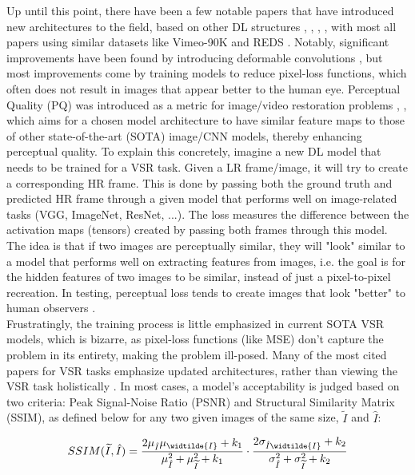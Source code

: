 \documentclass{article}
\begin{document}
Up until this point, there have been a few notable papers that have introduced new architectures to the field, based on other DL structures \cite{chan_basicvsr_2021}, \cite{chan_basicvsr_2022}, \cite{liang_recurrent_nodate}, \cite{rota_enhancing_2023}, with most all papers using similar datasets like Vimeo-90K \cite{xue_video_2019} and REDS \cite{nah_ntire_2021}. Notably, significant improvements have been found by introducing deformable convolutions \cite{dai_deformable_2016}, but most improvements come by training models to reduce pixel-loss functions, which often does not result in images that appear better to the human eye. Perceptual Quality (PQ) was introduced as a metric for image/video restoration problems \cite{johnson_perceptual_2016}, \cite{zhang_unreasonable_2018}, which aims for a chosen model architecture to have similar feature maps to those of other state-of-the-art (SOTA) image/CNN models, thereby enhancing perceptual quality. To explain this concretely, imagine a new DL model that needs to be trained for a VSR task. Given a LR frame/image, it will try to create a corresponding HR frame.  This is done by passing both the ground truth and predicted HR frame through a given model that performs well on image-related tasks (VGG, ImageNet, ResNet, ...). The loss measures the difference between the activation maps (tensors) created by passing both frames through this model. The idea is that if two images are perceptually similar, they will "look" similar to a model that performs well on extracting features from images, i.e. the goal is for the hidden features of two images to be similar, instead of just a pixel-to-pixel recreation. In testing, perceptual loss tends to create images that look "better" to human observers \cite{zhang_unreasonable_2018}. \\ %

Frustratingly, the training process is little emphasized in current SOTA VSR models, which is bizarre, as pixel-loss functions (like MSE) don’t capture the problem in its entirety, making the problem ill-posed. Many of the most cited papers for VSR tasks emphasize updated architectures, rather than viewing the VSR task holistically \cite{liu_video_2022}. In most cases, a model's acceptability is judged based on two criteria: Peak Signal-Noise Ratio (PSNR) and Structural Similarity Matrix (SSIM), as defined below for any two given images of the same size, \(\widetilde{I}\) and \(\hat{I}\): 

\begin{equation}
    SSIM(\widetilde{I}, \hat{I}) = \frac{
        2 \mu_{\hat{I}} \mu_{\widtilde{I}} + k_1}{
        \mu^2_{\hat{I}} + \mu^2_{\widetilde{I}} + k_1}
        \cdot
        \frac{
        2 \sigma_{\hat{I} \widtilde{I}} + k_2
        }{ \sigma^2_{\hat{I}} + \sigma^2_{\widetilde{I}} + k_2}
\end{equation}
\end{document}
